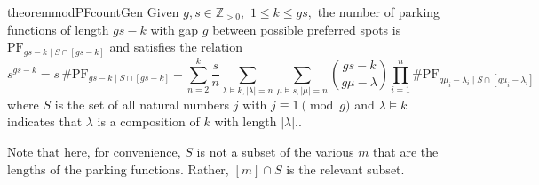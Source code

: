 \documentclass[12 pt]{amsart}
\theoremstyle{definition} %
\theoremstyle{remark} %
\begin{document}
\begin{restatable}{theorem}{modPFcountGen}
	Given $g,s\in\mathbb{Z}_{>0},$ $1\le k\le gs,$ the number of parking functions of length $gs - k$ with gap $g$ between possible preferred spots is $\mathrm{PF}_{gs - k \mid S \cap [gs - k]}$ and satisfies the relation
	\[
		s^{gs - k} = s \, \# \mathrm{PF}_{gs - k \mid S \cap [gs - k]} + \sum_{n = 2}^{k} \frac{s}{n} \sum_{\lambda \vDash k, \lvert \lambda \rvert = n} \sum_{\mu \vDash s, \lvert \mu \rvert = n} \binom{gs - k}{g \mu - \lambda} \prod_{i = 1}^{n} \# \mathrm{PF}_{g \mu_{i} - \lambda_{i} \mid S \cap [g \mu_{i} - \lambda_{i}]}
	\]
	where $S$ is the set of all natural numbers $j$ with $j \equiv 1 \pmod g$ and $\lambda \vDash k$ indicates that $\lambda$ is a composition of $k$ with length $|\lambda|.$.
\end{restatable}

Note that here, for convenience, $S$ is not a subset of the various $m$ that are the lengths of the parking functions. Rather, $[m] \cap S$ is the relevant subset. 
\end{document}
